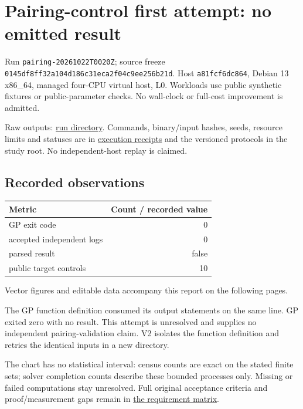 \documentclass[
  10pt,
  letterpaper,
  landscape]{article}
\author{}
\date{}
\begin{document}
\section{Pairing-control first attempt: no emitted
result}\label{pairing-control-first-attempt-no-emitted-result}

Run \texttt{pairing-20261022T0020Z}; source freeze
\texttt{0145df8ff32a104d186c31eca2f04c9ee256b21d}. Host
\texttt{a81fcf6dc864}, Debian 13 x86\_64, managed four-CPU virtual host,
L0. Workloads use public synthetic fixtures or public-parameter checks.
No wall-clock or full-cost improvement is admitted.

Raw outputs:
\href{../../../execution-v1/runs/pairing-20261022T0020Z/}{run
directory}. Commands, binary/input hashes, seeds, resource limits and
statuses are in \href{../../../execution-v1/}{execution receipts} and
the versioned protocols in the study root. No independent-host replay is
claimed.

\subsection{Recorded observations}\label{recorded-observations}

\begin{longtable}[]{@{}lr@{}}
\toprule\noalign{}
Metric & Count / recorded value \\
\midrule\noalign{}
\endhead
\bottomrule\noalign{}
\endlastfoot
GP exit code & 0 \\
accepted independent logs & 0 \\
parsed result & false \\
public target controls & 10 \\
\end{longtable}

Vector figures and editable data accompany this report on the following pages.

The GP function definition consumed its output statements on the same
line. GP exited zero with no result. This attempt is unresolved and
supplies no independent pairing-validation claim. V2 isolates the
function definition and retries the identical inputs in a new directory.

The chart has no statistical interval: census counts are exact on the
stated finite sets; solver completion counts describe these bounded
processes only. Missing or failed computations stay unresolved. Full
original acceptance criteria and proof/measurement gaps remain in
\href{../../../EXPERIMENTS.md}{the requirement matrix}.
\end{document}
